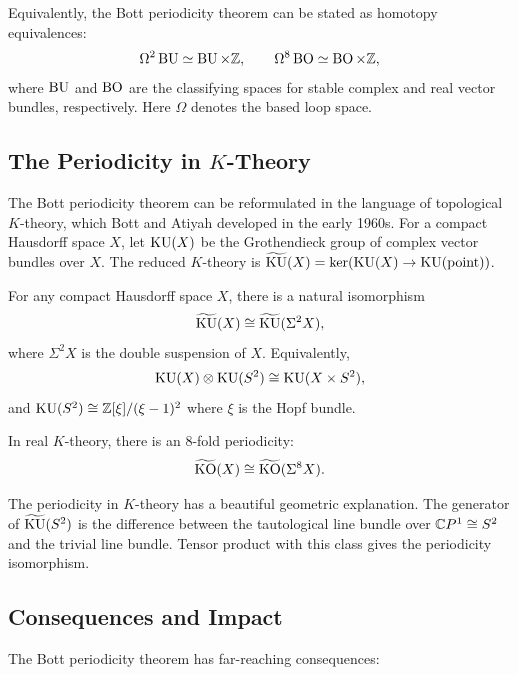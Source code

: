 Equivalently, the Bott periodicity theorem can be stated as homotopy equivalences:
\[
\Omega^2 \operatorname{BU} \simeq \operatorname{BU} \times \mathbb{Z}, \qquad \Omega^8 \operatorname{BO} \simeq \operatorname{BO} \times \mathbb{Z},
\]
where \(\operatorname{BU}\) and \(\operatorname{BO}\) are the classifying spaces for stable complex and real vector bundles, respectively. Here \(\Omega\) denotes the based loop space.

\subsection{The Periodicity in \texorpdfstring{\(K\)}{K}-Theory}

The Bott periodicity theorem can be reformulated in the language of topological \(K\)-theory, which Bott and Atiyah developed in the early 1960s. For a compact Hausdorff space \(X\), let \(\operatorname{KU}(X)\) be the Grothendieck group of complex vector bundles over \(X\). The reduced \(K\)-theory is \(\widetilde{\operatorname{KU}}(X) = \ker(\operatorname{KU}(X) \to \operatorname{KU}(\text{point}))\).

\begin{theorem}
For any compact Hausdorff space \(X\), there is a natural isomorphism
\[
\widetilde{\operatorname{KU}}(X) \cong \widetilde{\operatorname{KU}}(\Sigma^2 X),
\]
where \(\Sigma^2 X\) is the double suspension of \(X\). Equivalently,
\[
\operatorname{KU}(X) \otimes \operatorname{KU}(S^2) \cong \operatorname{KU}(X \times S^2),
\]
and \(\operatorname{KU}(S^2) \cong \mathbb{Z}[\xi]/(\xi-1)^2\) where \(\xi\) is the Hopf bundle.

In real \(K\)-theory, there is an \(8\)-fold periodicity:
\[
\widetilde{\operatorname{KO}}(X) \cong \widetilde{\operatorname{KO}}(\Sigma^8 X).
\]
\end{theorem}

The periodicity in \(K\)-theory has a beautiful geometric explanation. The generator of \(\widetilde{\operatorname{KU}}(S^2)\) is the difference between the tautological line bundle over \(\mathbb{C} P^1 \cong S^2\) and the trivial line bundle. Tensor product with this class gives the periodicity isomorphism.

\subsection{Consequences and Impact}

The Bott periodicity theorem has far-reaching consequences:

